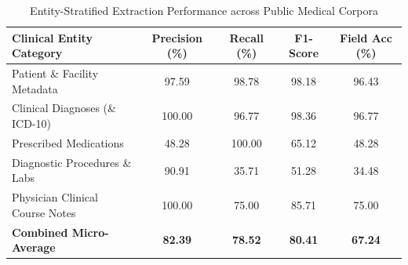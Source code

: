 \begin{table}[ht]
\centering
\caption{Entity-Stratified Extraction Performance across Public Medical Corpora}
\label{tab:report_entity_breakdown}
\begin{tabular}{|l|c|c|c|c|}
\hline
\textbf{Clinical Entity Category} & \textbf{Precision (\%)} & \textbf{Recall (\%)} & \textbf{F1-Score} & \textbf{Field Acc (\%)} \\
\hline
Patient \& Facility Metadata & 97.59 & 98.78 & 98.18 & 96.43 \\
Clinical Diagnoses (\& ICD-10) & 100.00 & 96.77 & 98.36 & 96.77 \\
Prescribed Medications & 48.28 & 100.00 & 65.12 & 48.28 \\
Diagnostic Procedures \& Labs & 90.91 & 35.71 & 51.28 & 34.48 \\
Physician Clinical Course Notes & 100.00 & 75.00 & 85.71 & 75.00 \\
\hline
\textbf{Combined Micro-Average} & \textbf{82.39} & \textbf{78.52} & \textbf{80.41} & \textbf{67.24} \\
\hline
\end{tabular}
\end{table}